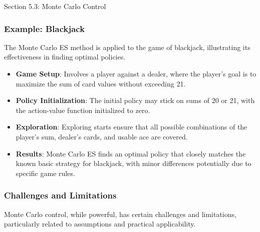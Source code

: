 \begin{notes}{Section 5.3: Monte Carlo Control}
\begin{highlight}
    \end{highlight}
    
    \subsubsection*{Example: Blackjack}
    
    The Monte Carlo ES method is applied to the game of blackjack, illustrating its effectiveness in finding optimal policies.
    
    \begin{highlight}
    
        \begin{itemize}
            \item \textbf{Game Setup}: Involves a player against a dealer, where the player's goal is to maximize the sum of card values without exceeding 21.
            \item \textbf{Policy Initialization}: The initial policy may stick on sums of 20 or 21, with the action-value function initialized to zero.
            \item \textbf{Exploration}: Exploring starts ensure that all possible combinations of the player's sum, dealer's cards, and usable ace are covered.
            \item \textbf{Results}: Monte Carlo ES finds an optimal policy that closely matches the known basic strategy for blackjack, with minor differences potentially due to specific game rules.
        \end{itemize}
    
    \end{highlight}
    
    \subsubsection*{Challenges and Limitations}
    
    Monte Carlo control, while powerful, has certain challenges and limitations, particularly related to assumptions and practical applicability.
    
    \begin{highlight}
    

\end{highlight}
\end{notes}
